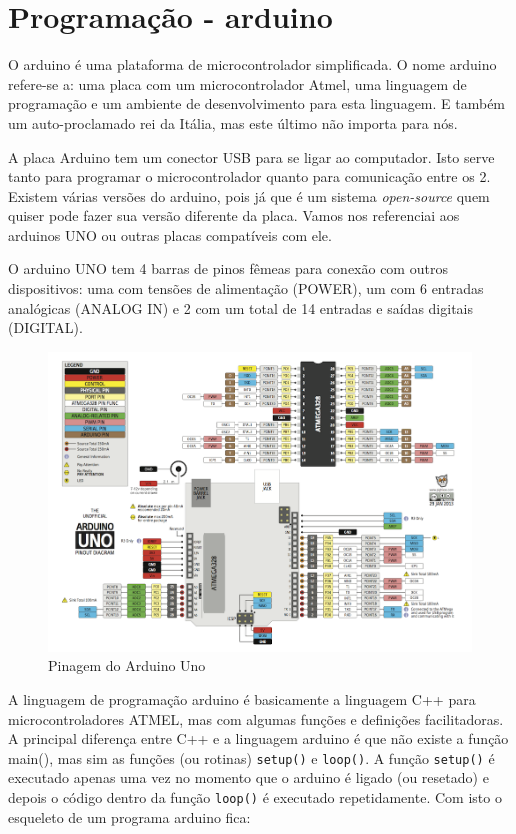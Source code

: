 \chapter{Programação - arduino}
O arduino é uma plataforma de microcontrolador simplificada. O nome arduino refere-se a: uma placa com um microcontrolador Atmel, uma linguagem de programação e um ambiente de desenvolvimento para esta linguagem. E também um auto-proclamado rei da Itália, mas este último não importa para nós.

A placa Arduino tem um conector USB para se ligar ao computador. Isto serve tanto para programar o microcontrolador quanto para comunicação entre os 2. Existem várias versões do arduino, pois já que é um sistema \emph{open-source} quem quiser pode fazer sua versão diferente da placa. Vamos nos referenciai aos arduinos UNO ou outras placas compatíveis com ele.

O arduino UNO tem 4 barras de pinos fêmeas para conexão com outros dispositivos: uma com tensões de alimentação (POWER), um com 6 entradas analógicas (ANALOG IN) e 2 com um total de 14 entradas e saídas digitais (DIGITAL).
\begin{figure}[hbt]
	\centering
	\includegraphics[width=\textwidth]{figuras/Arduino-Uno-Pinout}
	\caption{Pinagem do Arduino Uno}
	\label{fig:pinagem-arduino-uno}
\end{figure}

A linguagem de programação arduino é basicamente a linguagem C++ para microcontroladores ATMEL, mas com algumas funções e definições facilitadoras. A principal diferença entre C++ e a linguagem arduino é que não existe a função main(), mas sim as funções (ou rotinas) \lstinline|setup()| e \lstinline|loop()|. A função \lstinline|setup()| é executado apenas uma vez no momento que o arduino é ligado (ou resetado) e depois o código dentro da função \lstinline|loop()| é executado repetidamente. Com isto o esqueleto de um programa arduino fica:

